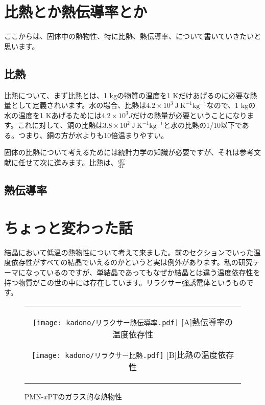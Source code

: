 \documentclass[10pt,b5paper,papersize,dvipdfmx]{jsbook}
\begin{document}
\section{比熱とか熱伝導率とか}
ここからは、固体中の熱物性、特に比熱、熱伝導率、について書いていきたいと思います。
\subsection{比熱}
比熱について、まず比熱とは、1 kgの物質の温度を1 Kだけあげるのに必要な熱量として定義されいます。水の場合、比熱は$4.2 \times 10^3\  \mathrm{J\ K ^{-1} kg^{-1}}$なので、1 kgの水の温度を1 Kあげるためには$4.2 \times 10^3 J$だけの熱量が必要ということになります。これに対して、銅の比熱は$3.8 \times 10^2\ \mathrm{J\ K ^{-1} kg^{-1}}$と水の比熱の1/10以下である。つまり、銅の方が水よりも10倍温まりやすい。\par
固体の比熱について考えるためには統計力学の知識が必要ですが、それは参考文献に任せて次に進みます。比熱は、$\frac{\mathrm{d}U}{\mathrm{d}T}$
\subsection{熱伝導率}
\section{ちょっと変わった話}
結晶において低温の熱物性について考えて来ました。前のセクションでいった温度依存性がすべての結晶でいえるのかというと実は例外があります。私の研究テーマになっているのですが、単結晶であってもなぜか結晶とは違う温度依存性を持つ物質がこの世の中には存在しています。リラクサー強誘電体というものです。

\begin{figure}[htbp]
  \begin{center}
      \begin{tabular}{c}  
      \begin{minipage}{0.5\hsize}
          \begin{center}
          \texttt{[image: kadono/リラクサー熱伝導率.pdf]}
          \hspace{1.6cm} [A]熱伝導率の温度依存性
      \end{center}
  \end{minipage}
  \begin{minipage}{0.5\hsize}
      \begin{center}
          \texttt{[image: kadono/リラクサー比熱.pdf]}
          \hspace{1.6cm} [B]比熱の温度依存性
      \end{center}
      \end{minipage}
      \end{tabular}
      \caption{PMN-$x$PTのガラス的な熱物性\cite{relaxCT}}
      \label{fig:lena}
  \end{center}
\end{figure}
\end{document}
